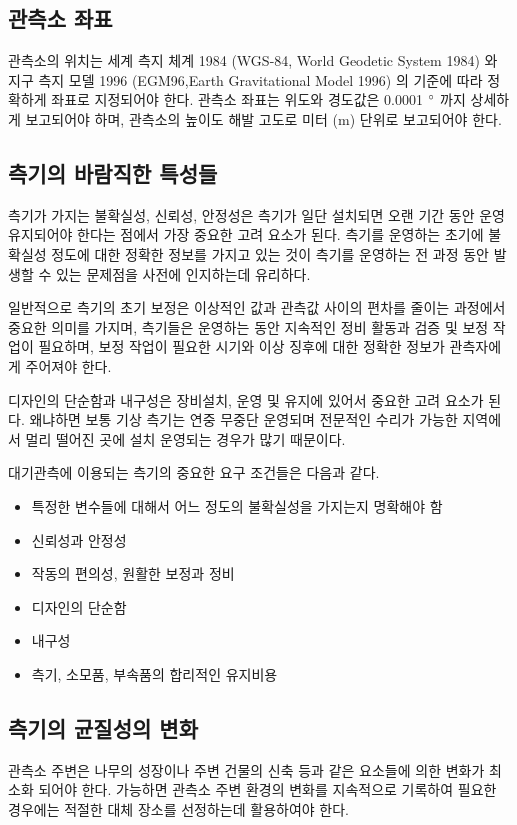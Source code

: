 \subsection{관측소 좌표}
관측소의 위치는 세계 측지 체계 1984 (WGS-84, World Geodetic System 1984) 와 지구 측지 모델 1996 (EGM96,Earth Gravitational Model 1996) 의 기준에 따라 정확하게 좌표로 지정되어야 한다. 관측소 좌표는 위도와 경도값은 0.0001 $\rm ^{\circ}$ 까지 상세하게 보고되어야 하며, 관측소의 높이도 해발 고도로 미터 (m) 단위로 보고되어야 한다.

\subsection{측기의 바람직한 특성들}

측기가 가지는 불확실성, 신뢰성, 안정성은 측기가 일단 설치되면 오랜 기간 동안 운영 유지되어야 한다는 점에서 가장 중요한 고려 요소가 된다. 측기를 운영하는 초기에 불확실성 정도에 대한 정확한 정보를 가지고 있는 것이 측기를 운영하는 전 과정 동안 발생할 수 있는 문제점을 사전에 인지하는데 유리하다.

일반적으로 측기의 초기 보정은 이상적인 값과 관측값 사이의 편차를 줄이는 과정에서 중요한 의미를 가지며, 측기들은 운영하는 동안 지속적인 정비 활동과 검증 및 보정 작업이 필요하며, 보정 작업이 필요한 시기와 이상 징후에 대한 정확한 정보가 관측자에게 주어져야 한다.

디자인의 단순함과 내구성은 장비설치, 운영 및 유지에 있어서 중요한 고려 요소가 된다. 왜냐하면 보통 기상 측기는 연중 무중단 운영되며 전문적인 수리가 가능한 지역에서 멀리 떨어진 곳에 설치 운영되는 경우가 많기 때문이다.

대기관측에 이용되는 측기의 중요한 요구 조건들은 다음과 같다.

\begin{itemize}
	\item 특정한 변수들에 대해서 어느 정도의 불확실성을 가지는지 명확해야 함
	\item 신뢰성과 안정성
	\item 작동의 편의성, 원활한 보정과 정비
	\item 디자인의 단순함
	\item 내구성
	\item 측기, 소모품, 부속품의 합리적인 유지비용
\end{itemize}

\subsection{측기의 균질성의 변화}
관측소 주변은 나무의 성장이나 주변 건물의 신축 등과 같은 요소들에 의한 변화가 최소화 되어야 한다. 가능하면 관측소 주변 환경의 변화를 지속적으로 기록하여 필요한 경우에는 적절한 대체 장소를 선정하는데 활용하여야 한다. 

